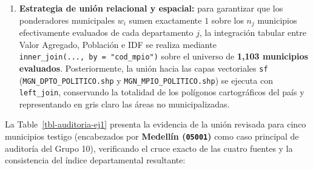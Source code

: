 \documentclass[
  10pt,
  letterpaper,
  DIV=11,
  numbers=noendperiod]{scrartcl}
\providecommand{\tightlist}{%
  \setlength{\itemsep}{0pt}\setlength{\parskip}{0pt}}
\begin{document}
\begin{enumerate}
  \begin{itemize}
  \tightlist
  \item
    \textbf{18 Áreas No Municipalizadas (ANM / corregimientos
    departamentales)} en Amazonas (9: El Encanto, La Chorrera, La
    Pedrera, La Victoria, Mirití-Paraná, Puerto Alegría, Puerto Arica,
    Santander y Tarapacá), Guainía (6: Cacahual, La Guadalupe, Morichal,
    Pana Pana, Puerto Colombia y San Felipe) y Vaupés (3: Pacoa,
    Papunahua y Yavaraté), las cuales carecen de alcaldía y presupuesto
    municipal autónomo bajo la Ley 617 de 2000.
  \item
    \textbf{Mapiripana (\texttt{94663}, Guainía):} antiguo corregimiento
    departamental integrado territorialmente a Inírida que registra
    valor agregado igual a cero en las cuentas municipales del DANE.
  \item
    \textbf{San Andrés (\texttt{88001}, Archipiélago de San Andrés,
    Providencia y Santa Catalina):} evaluado por el DNP dentro de la
    matriz de \emph{departamentos} por su régimen administrativo
    especial, razón por la cual a escala municipal solo se califica al
    municipio de \textbf{Providencia (\texttt{88564})} con
    \(\text{IDF}_{2024} = 55.23\) puntos (\(w_i = 1.0000\)).
  \end{itemize}
\item
  \textbf{Estrategia de unión relacional y espacial:} para garantizar
  que los ponderadores municipales \(w_i\) sumen exactamente \(1\) sobre
  los \(n_j\) municipios efectivamente evaluados de cada departamento
  \(j\), la integración tabular entre Valor Agregado, Población e IDF se
  realiza mediante \texttt{inner\_join(...,\ by\ =\ "cod\_mpio")} sobre
  el universo de \textbf{1,103 municipios evaluados}. Posteriormente, la
  unión hacia las capas vectoriales \texttt{sf}
  (\texttt{MGN\_DPTO\_POLITICO.shp} y \texttt{MGN\_MPIO\_POLITICO.shp})
  se ejecuta con \texttt{left\_join}, conservando la totalidad de los
  polígonos cartográficos del país y representando en gris claro las
  áreas no municipalizadas.
\end{enumerate}

La Table~\ref{tbl-auditoria-ej1} presenta la evidencia de la unión
revisada para cinco municipios testigo (encabezados por \textbf{Medellín
(\texttt{05001})} como caso principal de auditoría del Grupo 10),
verificando el cruce exacto de las cuatro fuentes y la consistencia del
índice departamental resultante:
\end{document}
